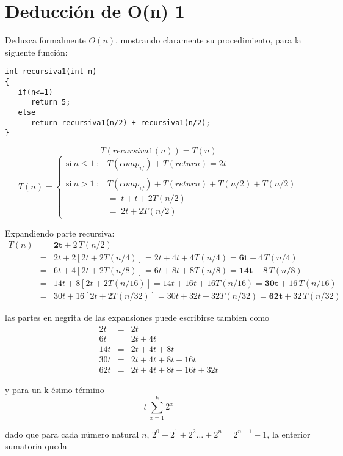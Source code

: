 \section{Deducción de O(n) 1}
Deduzca formalmente $O(n)$, mostrando claramente su procedimiento,
para la siguente función:

\begin{lstlisting}[style=miEstilo, numbers=none]
int recursiva1(int n)
{
   if(n<=1)
      return 5;
   else
      return recursiva1(n/2) + recursiva1(n/2);
}
\end{lstlisting}

\[ T(recursiva1(n))=T(n)\]
$$$$
\begin{equation*}
  \label{eq:definicion-por-partes1}
  T(n) = \left\{
    \begin{array}{ll}
      \mathrm{si\ } n \le 1 \; :    &  T(comp_{if})+T(return)=2t\\
      &\\
      \mathrm{si\ } n > 1 \; : &  T(comp_{if})+T(return)+T(n/2)+T(n/2)\\
               & =\;t+t+2T(n/2)\\
               & =\;2t+2T(n/2)
    \end{array}
  \right.
\end{equation*}

Expandiendo parte recursiva:
\begin{eqnarray*}
  \label{eq:1}
  T(n)&=&\mathbf{2t}+2\,T(n/2)\\
  &=&2t+2[2t+2T(n/4)]=2t+4t+4T(n/4)=\mathbf{6t}+4\,T(n/4)\\
  &=&6t+4[2t+2T(n/8)]=6t+8t+8T(n/8)=\mathbf{14t}+8\,T(n/8)\\
  &=&14t+8[2t+2T(n/16)]=14t+16t+16T(n/16)=\mathbf{30t}+16\,T(n/16)\\
  &=&30t+16[2t+2T(n/32)]=30t+32t+32T(n/32)=\mathbf{62t}+32\,T(n/32)
\end{eqnarray*}

las partes en negrita de las expansiones puede escribirse tambien como
\begin{eqnarray*}
  2t&=&2t\\
  6t&=&2t+4t\\
  14t&=&2t+4t+8t\\
  30t&=&2t+4t+8t+16t\\
  62t&=&2t+4t+8t+16t+32t
\end{eqnarray*}

y para un k-ésimo término
$$t\,\sum_{x=1}^k2^x$$

dado que para cada número natural $n$, $2^0+2^1+2^2 \ldots +2^n=2^{n+1}-1$, la
enterior sumatoria queda

